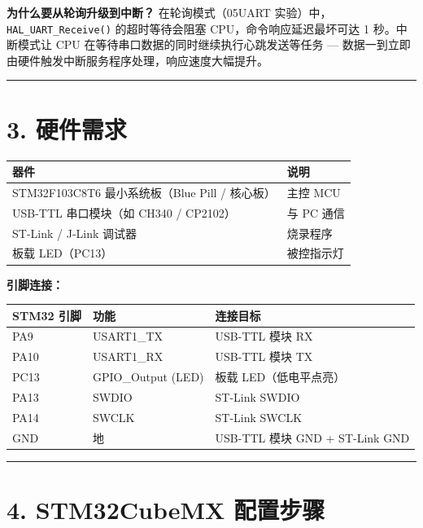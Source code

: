 \documentclass[
  chinese,
  UTF8,
  oneside,
  openany]{ctexbook}
\begin{document}
\textbf{为什么要从轮询升级到中断？} 在轮询模式（05UART
实验）中，\texttt{HAL\_UART\_Receive()} 的超时等待会阻塞
CPU，命令响应延迟最坏可达 1 秒。中断模式让 CPU
在等待串口数据的同时继续执行心跳发送等任务 ---
数据一到立即由硬件触发中断服务程序处理，响应速度大幅提升。

\begin{center}\rule{0.5\linewidth}{0.5pt}\end{center}

\section{3. 硬件需求}\label{ux786cux4ef6ux9700ux6c42-1}

\begin{longtable}[]{@{}ll@{}}
\toprule\noalign{}
器件 & 说明 \\
\midrule\noalign{}
\endhead
\bottomrule\noalign{}
\endlastfoot
STM32F103C8T6 最小系统板（Blue Pill / 核心板） & 主控 MCU \\
USB-TTL 串口模块（如 CH340 / CP2102） & 与 PC 通信 \\
ST-Link / J-Link 调试器 & 烧录程序 \\
板载 LED（PC13） & 被控指示灯 \\
\end{longtable}

\textbf{引脚连接：}

\begin{longtable}[]{@{}lll@{}}
\toprule\noalign{}
STM32 引脚 & 功能 & 连接目标 \\
\midrule\noalign{}
\endhead
\bottomrule\noalign{}
\endlastfoot
PA9 & USART1\_TX & USB-TTL 模块 RX \\
PA10 & USART1\_RX & USB-TTL 模块 TX \\
PC13 & GPIO\_Output (LED) & 板载 LED（低电平点亮） \\
PA13 & SWDIO & ST-Link SWDIO \\
PA14 & SWCLK & ST-Link SWCLK \\
GND & 地 & USB-TTL 模块 GND + ST-Link GND \\
\end{longtable}

\begin{center}\rule{0.5\linewidth}{0.5pt}\end{center}

\section{4. STM32CubeMX
配置步骤}\label{stm32cubemx-ux914dux7f6eux6b65ux9aa4-3}
\end{document}
